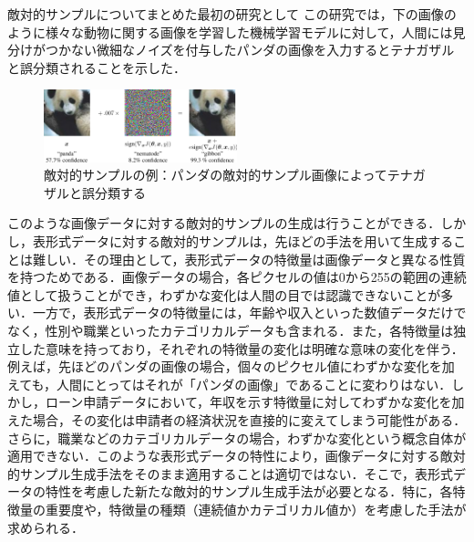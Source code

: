 敵対的サンプルについてまとめた最初の研究として
この研究では，下の画像のように様々な動物に関する画像を学習した機械学習モデルに対して，人間には見分けがつかない微細なノイズを付与したパンダの画像を入力するとテナガザルと誤分類されることを示した．

\begin{figure}[h]
    \centering
    \includegraphics[width=0.5\textwidth]{images/goodfellow_panda.png}
    \caption{敵対的サンプルの例：パンダの敵対的サンプル画像によってテナガザルと誤分類する}
    \label{fig:adversarial_example}
\end{figure}

このような画像データに対する敵対的サンプルの生成は行うことができる．しかし，表形式データに対する敵対的サンプルは，先ほどの手法を用いて生成することは難しい．その理由として，表形式データの特徴量は画像データと異なる性質を持つためである．画像データの場合，各ピクセルの値は0から255の範囲の連続値として扱うことができ，わずかな変化は人間の目では認識できないことが多い．一方で，表形式データの特徴量には，年齢や収入といった数値データだけでなく，性別や職業といったカテゴリカルデータも含まれる．また，各特徴量は独立した意味を持っており，それぞれの特徴量の変化は明確な意味の変化を伴う．例えば，先ほどのパンダの画像の場合，個々のピクセル値にわずかな変化を加えても，人間にとってはそれが「パンダの画像」であることに変わりはない．しかし，ローン申請データにおいて，年収を示す特徴量に対してわずかな変化を加えた場合，その変化は申請者の経済状況を直接的に変えてしまう可能性がある．さらに，職業などのカテゴリカルデータの場合，わずかな変化という概念自体が適用できない．このような表形式データの特性により，画像データに対する敵対的サンプル生成手法をそのまま適用することは適切ではない．そこで，表形式データの特性を考慮した新たな敵対的サンプル生成手法が必要となる．特に，各特徴量の重要度や，特徴量の種類（連続値かカテゴリカル値か）を考慮した手法が求められる．

